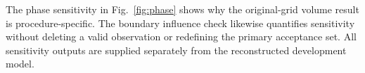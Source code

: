 \documentclass[journal]{IEEEtran}
\begin{document}
The phase sensitivity in Fig.~\ref{fig:phase} shows why the original-grid volume result is procedure-specific. The boundary influence check likewise quantifies sensitivity without deleting a valid observation or redefining the primary acceptance set. All sensitivity outputs are supplied separately from the reconstructed development model.







\end{document}
